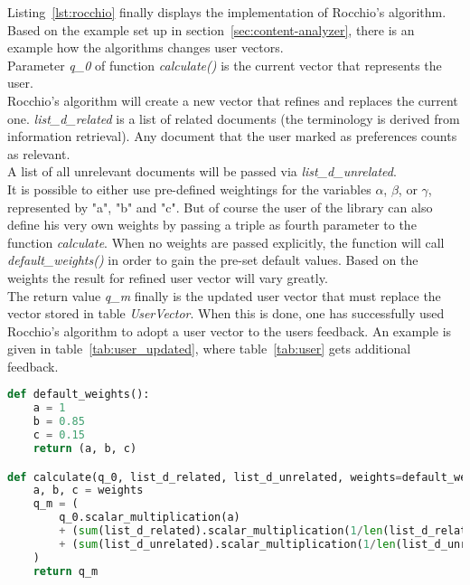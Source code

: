 \noindent
Listing~\ref{lst:rocchio} finally displays the implementation of Rocchio's algorithm.
Based on the example set up in section~\ref{sec:content-analyzer}, there is an example how the algorithms changes user vectors.\\
Parameter \textit{q\_0} of function \textit{calculate()} is the current vector that represents the user.\\
Rocchio's algorithm will create a new vector that refines and replaces the current one.
\textit{list\_d\_related} is a list of related documents (the terminology is derived from information retrieval).
Any document that the user marked as preferences counts as relevant.\\
A list of all unrelevant documents will be passed via \textit{list\_d\_unrelated}.\\
It is possible to either use pre-defined weightings for the variables $\alpha$, $\beta$, or $\gamma$, represented by "a", "b" and "c".
But of course the user of the library can also define his very own weights by passing a triple as fourth parameter to the function \textit{calculate}.
When no weights are passed explicitly, the function will call \textit{default\_weights()} in order to gain the pre-set default values.
Based on the weights the result for refined user vector will vary greatly.\\
The return value \textit{q\_m} finally is the updated user vector that must replace the vector stored in table \textit{UserVector}.
When this is done, one has successfully used Rocchio's algorithm to adopt a user vector to the users feedback.
An example is given in table~\ref{tab:user_updated}, where table~\ref{tab:user} gets additional feedback.

\begin{lstlisting}[language=Python,caption={Implementation of Rocchio's algorithm},label={lst:rocchio},float=h]
def default_weights():
    a = 1
    b = 0.85
    c = 0.15
    return (a, b, c)

def calculate(q_0, list_d_related, list_d_unrelated, weights=default_weights()):
    a, b, c = weights
    q_m = (
        q_0.scalar_multiplication(a)
        + (sum(list_d_related).scalar_multiplication(1/len(list_d_related))).scalar_multiplication(b)
        + (sum(list_d_unrelated).scalar_multiplication(1/len(list_d_unrelated))).scalar_multiplication(c)
    )
    return q_m
\end{lstlisting}

